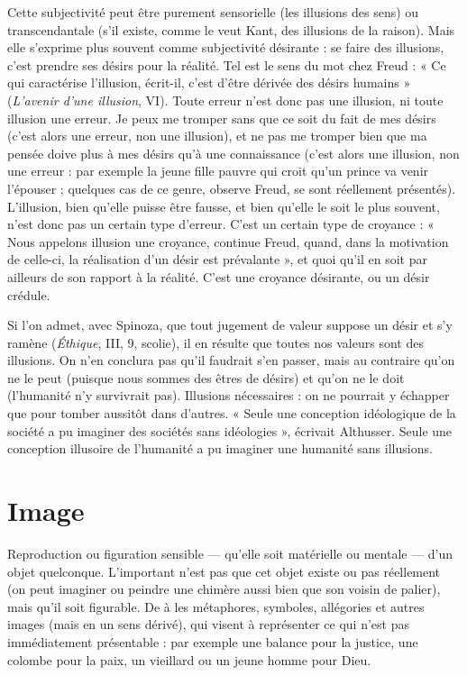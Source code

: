 Cette subjectivité peut être purement sensorielle (les illusions des sens) ou
transcendantale (s’il existe, comme le veut Kant, des illusions de la raison).
Mais elle s'exprime plus souvent comme subjectivité désirante : se faire des illusions,
c’est prendre ses désirs pour la réalité. Tel est le sens du mot chez Freud :
« Ce qui caractérise l'illusion, écrit-il, c’est d’être dérivée des désirs humains »
({\it L'avenir d'une illusion}, VI). Toute erreur n’est donc pas une illusion, ni toute
illusion une erreur. Je peux me tromper sans que ce soit du fait de mes désirs
(c'est alors une erreur, non une illusion), et ne pas me tromper bien que ma
pensée doive plus à mes désirs qu’à une connaissance (c’est alors une illusion,
non une erreur : par exemple la jeune fille pauvre qui croit qu’un prince va
venir l’épouser ; quelques cas de ce genre, observe Freud, se sont réellement
présentés). L’illusion, bien qu’elle puisse être fausse, et bien qu’elle le soit le
plus souvent, n’est donc pas un certain type d’erreur. C’est un certain type de
croyance : « Nous appelons illusion une croyance, continue Freud, quand, dans
la motivation de celle-ci, la réalisation d’un désir est prévalante », et quoi qu’il
en soit par ailleurs de son rapport à la réalité. C’est une croyance désirante, ou
un désir crédule.

Si l’on admet, avec Spinoza, que tout jugement de valeur suppose un désir
et s’y ramène ({\it Éthique}, III, 9, scolie), il en résulte que toutes nos valeurs sont
des illusions. On n’en conclura pas qu’il faudrait s’en passer, mais au contraire
qu'on ne le peut (puisque nous sommes des êtres de désirs) et qu’on ne le doit
(l'humanité n’y survivrait pas). Illusions nécessaires : on ne pourrait y échapper
que pour tomber aussitôt dans d’autres. « Seule une conception idéologique de
la société a pu imaginer des sociétés sans idéologies », écrivait Althusser. Seule
une conception illusoire de l'humanité a pu imaginer une humanité sans illusions.

\section{Image}
Reproduction ou figuration sensible — qu’elle soit matérielle ou
mentale — d’un objet quelconque. L'important n’est pas que cet
objet existe ou pas réellement (on peut imaginer ou peindre une chimère aussi
bien que son voisin de palier), mais qu’il soit figurable. De à les métaphores,
symboles, allégories et autres images (mais en un sens dérivé), qui visent à
représenter ce qui n’est pas immédiatement présentable : par exemple une
balance pour la justice, une colombe pour la paix, un vieillard ou un jeune
homme pour Dieu.

